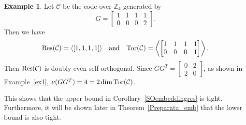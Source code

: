 \documentclass{article}
\theoremstyle{definition}
\newtheorem{example}{Example}[section]
\theoremstyle{remark}
\begin{document}
\begin{example}
    Let $\mathcal{C}$ be the code over $\mathbb{Z}_4$ generated by
    \[
    G=\begin{bmatrix}
        1 & 1 & 1 & 1\\0 & 0 & 0 & 2
    \end{bmatrix}.
    \]
    Then we have
    \[
    {\rm Res}(\mathcal{C})=\langle [1, 1, 1, 1]\rangle\quad\mbox{and}\quad{\rm Tor}(\mathcal{C})=\left\langle\begin{bmatrix}
        1 & 1 & 1 & 1\\0 & 0 & 0 & 1
    \end{bmatrix}\right\rangle.
    \]
    Then ${\rm Res}(\mathcal{C})$ is doubly even self-orthogonal. Since $GG^T=\begin{bmatrix} 0 & 2\\2 & 0 \end{bmatrix}$, as shown in Example~\ref{ex1}, $\nu(GG^T)=4=2\dim{\rm Tor}(\mathcal{C})$.

    This shows that the upper bound in Corollary~\ref{SOembeddingres} is tight. Furthermore, it will be shown later in Theorem~\ref{Preparata_emb} that the lower bound is also tight.
\end{example}
\end{document}
